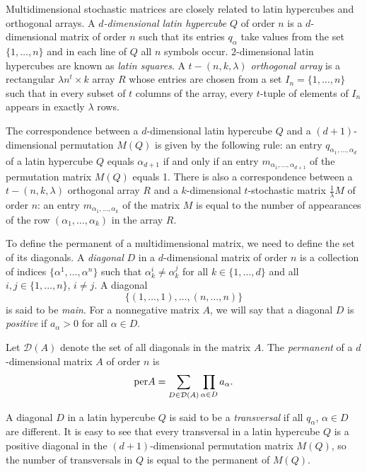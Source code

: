 \documentclass[a4paper]{article}
\begin{document}
Multidimensional stochastic matrices are closely related to latin hypercubes and orthogonal arrays. 
A \textit{$d$-dimensional latin hypercube} $Q$ of order $n$ is a $d$-dimensional matrix of order $n$ such that its entries $q_\alpha$  take values from the set  $\{1, \ldots, n \}$ and  in each line  of $Q$ all $n$ symbols occur. $2$-dimensional latin hypercubes are known as \textit{latin squares}.  A \textit{$t-(n,k,\lambda)$ orthogonal array} is a rectangular $\lambda n^t \times  k$ array $R$  whose entries are chosen from a set $I_n = \{ 1, \ldots, n \}$ such that in every subset of $t$ columns of the array, every $t$-tuple of  elements of  $I_n$ appears in exactly $\lambda$ rows.

The correspondence between a $d$-dimensional latin hypercube $Q$ and a $(d+1)$-dimensional permutation $M(Q)$ is given by the following rule: an entry $q_{\alpha_1, \ldots, \alpha_{d}}$ of a latin hypercube $Q$ equals $\alpha_{d+1}$ if and only if an entry $m_{\alpha_1, \ldots, \alpha_{d+1}}$ of the permutation matrix $M(Q)$ equals 1.  There is also a correspondence between a $t-(n,k,\lambda)$ orthogonal array $R$ and a $k$-dimensional $t$-stochastic matrix $\frac{1}{\lambda} M$ of order $n$: an entry $m_{\alpha_1, \ldots, \alpha_k}$ of the matrix $M$ is equal to the number of appearances of the row $(\alpha_1, \ldots, \alpha_k)$ in the array $R$.

To define the permanent of a multidimensional matrix, we need to define the set of its diagonals. 
A \textit{diagonal} $D$ in a $d$-dimensional matrix of order $n$ is a collection of indices $\{  \alpha^1, \ldots, \alpha^n \}$ such that  $\alpha^i_k \neq \alpha^j_k$ for all $k \in \{  1, \ldots, d\}$ and all  $i,j \in \{1, \ldots, n\}$, $i \neq j$.  A diagonal  
$$\{  (1, \ldots, 1), \ldots, (n,\ldots, n) \}$$
is said to be \textit{main}.   For a nonnegative matrix $A$, we will say that a diagonal $D$ is \textit{positive} if $a_{\alpha} > 0$ for all $\alpha \in D$. 

 Let $\mathcal{D}(A)$ denote the set of all diagonals in the matrix $A$.
The \textit{permanent} of a $d$-dimensional matrix $A$ of order $n$ is
$${\rm per} A = \sum\limits_{D \in \mathcal{D}(A)} \prod\limits_{\alpha \in D} a_{\alpha}.$$

A diagonal $D$ in a latin hypercube $Q$ is said to be a \textit{transversal}  if all  $q_\alpha$, $\alpha \in D$ are  different.  It is easy to see that every transversal in a latin hypercube $Q$  is a positive diagonal in the $(d+1)$-dimensional permutation matrix $M(Q)$, so the number of transversals in $Q$ is equal to the permanent of  $M(Q)$.
\end{document}
